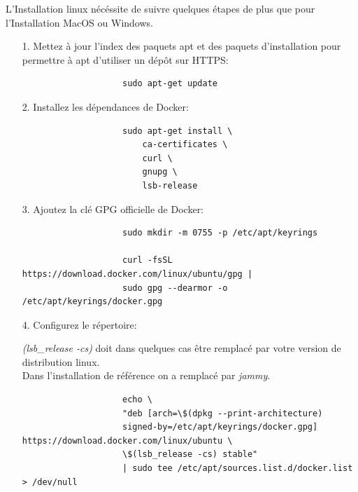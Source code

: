 \documentclass[internal]{nhitec_design}
\begin{document}
        L'Installation linux nécéssite de suivre quelques étapes de plus que pour l'Installation MacOS ou Windows.\\
        \begin{itemize}
     
            \item[1.] Mettez à jour l'index des paquets apt et des paquets d'installation pour permettre à apt d'utiliser un dépôt sur HTTPS:
            
                \begin{lstlisting}
                    sudo apt-get update
                \end{lstlisting}

            \item[2.] Installez les dépendances de Docker:

                \begin{lstlisting}
                    sudo apt-get install \
                        ca-certificates \
                        curl \
                        gnupg \
                        lsb-release
                \end{lstlisting}

\newpage

            \item[3.] Ajoutez la clé GPG officielle de Docker:

                \begin{lstlisting}
                    sudo mkdir -m 0755 -p /etc/apt/keyrings

                    curl -fsSL https://download.docker.com/linux/ubuntu/gpg | 
                    sudo gpg --dearmor -o /etc/apt/keyrings/docker.gpg
                \end{lstlisting}

            \item[4.] Configurez le répertoire:\\

                \begin{footnotesize}
                    \textit{\textdollar(lsb\_release -cs)} doit dans quelques cas être remplacé par votre version de distribution linux.\\
                    Dans l'installation de référence on a remplacé par \textit{jammy}.
                \end{footnotesize}
                \begin{lstlisting}
                    echo \
                    "deb [arch=\$(dpkg --print-architecture) 
                    signed-by=/etc/apt/keyrings/docker.gpg] https://download.docker.com/linux/ubuntu \
                    \$(lsb_release -cs) stable" 
                    | sudo tee /etc/apt/sources.list.d/docker.list > /dev/null
                \end{lstlisting}


\end{itemize}
\end{document}
